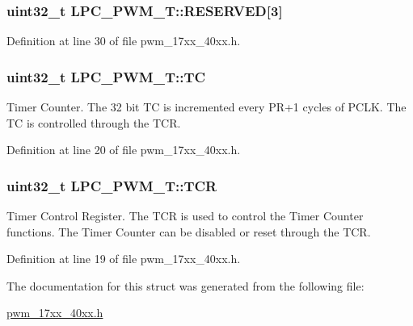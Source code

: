 \subsubsection[{\texorpdfstring{R\+E\+S\+E\+R\+V\+ED}{RESERVED}}]{ uint32\+\_\+t L\+P\+C\+\_\+\+P\+W\+M\+\_\+\+T\+::\+R\+E\+S\+E\+R\+V\+ED\mbox{[}3\mbox{]}}\hypertarget{structLPC__PWM__T_a417c4f30b4131f0959ba126c4aa0a13b}{}\label{structLPC__PWM__T_a417c4f30b4131f0959ba126c4aa0a13b}


Definition at line 30 of file pwm\+\_\+17xx\+\_\+40xx.\+h.

\subsubsection[{\texorpdfstring{TC}{TC}}]{ uint32\+\_\+t L\+P\+C\+\_\+\+P\+W\+M\+\_\+\+T\+::\+TC}\hypertarget{structLPC__PWM__T_a844caaab8bd038a17228927a1f98253e}{}\label{structLPC__PWM__T_a844caaab8bd038a17228927a1f98253e}
Timer Counter. The 32 bit TC is incremented every P\+R+1 cycles of P\+C\+LK. The TC is controlled through the T\+CR. 

Definition at line 20 of file pwm\+\_\+17xx\+\_\+40xx.\+h.

\subsubsection[{\texorpdfstring{T\+CR}{TCR}}]{ uint32\+\_\+t L\+P\+C\+\_\+\+P\+W\+M\+\_\+\+T\+::\+T\+CR}\hypertarget{structLPC__PWM__T_a1f24593dc70462c02ef71dc3fc5591af}{}\label{structLPC__PWM__T_a1f24593dc70462c02ef71dc3fc5591af}
Timer Control Register. The T\+CR is used to control the Timer Counter functions. The Timer Counter can be disabled or reset through the T\+CR. 

Definition at line 19 of file pwm\+\_\+17xx\+\_\+40xx.\+h.



The documentation for this struct was generated from the following file\+:\begin{DoxyCompactItemize}
\item 
\hyperlink{pwm__17xx__40xx_8h}{pwm\+\_\+17xx\+\_\+40xx.\+h}\end{DoxyCompactItemize}

